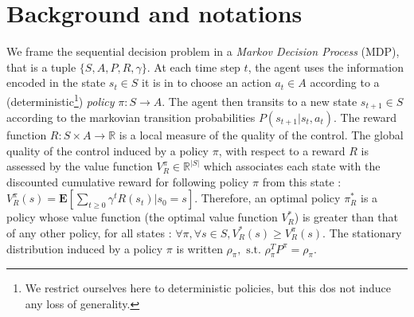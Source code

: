 \documentclass[11pt]{article}
\newcommand{\E}{\mathbf{E}}
\begin{document}
\section{Background and notations}
\label{sec:background}
We frame the sequential decision problem in a \emph{Markov Decision Process} (MDP), that is a tuple $\{S,A,P,R,\gamma\}$. At each time step $t$, the agent uses the information encoded in the state $s_t\in S$ it is in to choose an action $a_t \in A$ according to a (deterministic\footnote{We restrict ourselves here to deterministic policies, but this dos not induce any loss of generality.}) \emph{policy} $\pi: S \rightarrow A$. The agent then transits to a new state $s_{t+1}\in S$ according to the markovian transition probabilities $P(s_{t+1}|s_t,a_t)$. The reward function $R : S\times A \rightarrow \mathbb{R}$ is a local measure of the quality of the control. The global quality of the control induced by a policy $\pi$, with respect to a reward $R$ is assessed by the value function $V^\pi_R \in \mathbb{R}^{|S|}$ which associates each state with the discounted cumulative reward for following policy $\pi$ from this state : $V^\pi_R(s) = \E[\sum_{t\geq 0}\gamma^tR(s_t)|s_0 = s]$. Therefore, an optimal policy $\pi^*_R$ is a policy whose value function (the optimal value function $V^*_R$) is greater than that of any other policy, for all states : $\forall \pi, \forall s \in S, V^*_R(s) \geq V^\pi_R(s)$. The stationary distribution induced by a policy $\pi$ is written $\rho_\pi,\textrm{ s.t. }\rho_\pi^TP^\pi = \rho_\pi$.
\end{document}
